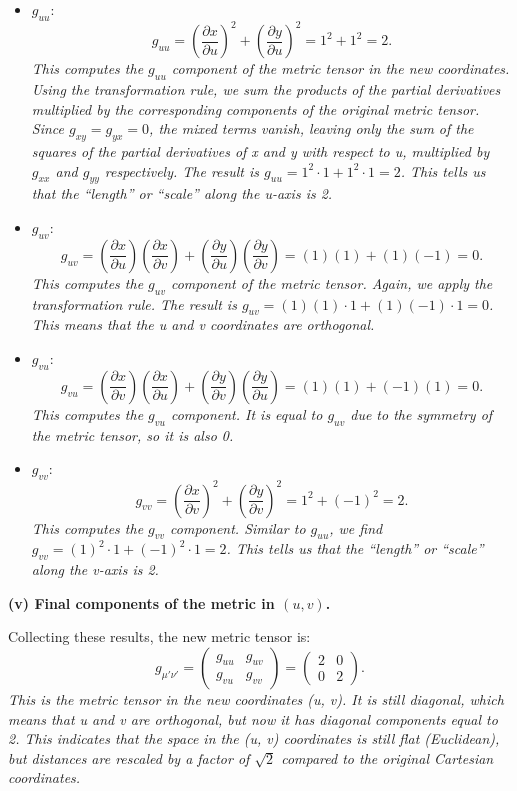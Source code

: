 \documentclass{article}
\begin{document}
\begin{itemize}
\item \(\displaystyle g_{uu}\):
\[
g_{uu}
=
\left(\frac{\partial x}{\partial u}\right)^2
+
\left(\frac{\partial y}{\partial u}\right)^2
=
1^2 + 1^2
=
2.
\]
\emph{This computes the \(g_{uu}\) component of the metric tensor in the new coordinates. Using the transformation rule, we sum the products of the partial derivatives multiplied by the corresponding components of the original metric tensor. Since \(g_{xy} = g_{yx} = 0\), the mixed terms vanish, leaving only the sum of the squares of the partial derivatives of x and y with respect to u, multiplied by \(g_{xx}\) and \(g_{yy}\) respectively. The result is \(g_{uu} = 1^2 \cdot 1 + 1^2 \cdot 1 = 2\). This tells us that the “length” or “scale” along the u-axis is 2.}

\item \(\displaystyle g_{uv}\):
\[
g_{uv}
=
\left(\frac{\partial x}{\partial u}\right)\left(\frac{\partial x}{\partial v}\right)
+
\left(\frac{\partial y}{\partial u}\right)\left(\frac{\partial y}{\partial v}\right) 
=
(1)(1) + (1)(-1)
=
0.
\]
\emph{This computes the \(g_{uv}\) component of the metric tensor. Again, we apply the transformation rule. The result is \(g_{uv} = (1)(1) \cdot 1 + (1)(-1) \cdot 1 = 0\). This means that the u and v coordinates are orthogonal.}

\item \(\displaystyle g_{vu}\):
\[
g_{vu}
=
\left(\frac{\partial x}{\partial v}\right)\left(\frac{\partial x}{\partial u}\right)
+
\left(\frac{\partial y}{\partial v}\right)\left(\frac{\partial y}{\partial u}\right) 
=
(1)(1) + (-1)(1)
=
0.
\]
\emph{This computes the \(g_{vu}\) component. It is equal to \(g_{uv}\) due to the symmetry of the metric tensor, so it is also 0.}

\item \(\displaystyle g_{vv}\):
\[
g_{vv} 
=
\left(\frac{\partial x}{\partial v}\right)^2
+ 
\left(\frac{\partial y}{\partial v}\right)^2 
= 
1^2 + (-1)^2 
= 
2.
\]
\emph{This computes the \(g_{vv}\) component. Similar to \(g_{uu}\), we find \(g_{vv} = (1)^2 \cdot 1 + (-1)^2 \cdot 1 = 2\). This tells us that the “length” or “scale” along the v-axis is 2.}
\end{itemize}

\textbf{(v) Final components of the metric in \((u,v)\).}

Collecting these results, the new metric tensor is:
\[
g_{\mu' \nu'} 
= 
\begin{pmatrix}
g_{uu} & g_{uv} \\
g_{vu} & g_{vv}
\end{pmatrix}
=
\begin{pmatrix}
2 & 0 \\
0 & 2
\end{pmatrix}.
\]
\emph{This is the metric tensor in the new coordinates (u, v). It is still diagonal, which means that u and v are orthogonal, but now it has diagonal components equal to 2. This indicates that the space in the (u, v) coordinates is still flat (Euclidean), but distances are rescaled by a factor of \(\sqrt{2}\) compared to the original Cartesian coordinates.}
\end{document}
